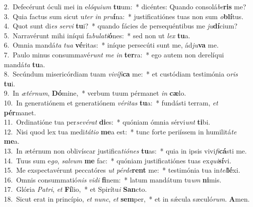 {2.~}Defecérunt óculi mei in e\textit{ló}\textit{qui}\textit{um} \textbf{tu}um:~* dicéntes: Quando consolá\textit{be}\textbf{ris} me?\\
{3.~}Quia factus sum sicut u\textit{ter} \textit{in} \textit{pru}\textbf{í}na:~* justificatiónes tuas non sum \textit{o}\textbf{blí}tus.\\
{4.~}Quot sunt di\textit{es} \textit{ser}\textit{vi} \textbf{tu}i?~* quando fácies de persequéntibus me \textit{ju}\textbf{dí}cium?\\
{5.~}Narravérunt mihi iníqui fa\textit{bu}\textit{la}\textit{ti}\textbf{ó}nes:~* sed non ut \textit{lex} \textbf{tu}a.\\
{6.~}Omnia mandá\textit{ta} \textit{tu}\textit{a} \textbf{vé}ritas:~* iníque persecúti sunt me, ád\textit{ju}\textbf{va} me.\\
{7.~}Paulo minus consummavé\textit{runt} \textit{me} \textit{in} \textbf{ter}ra:~* ego autem non derelíqui mandá\textit{ta} \textbf{tu}a.\\
{8.~}Secúndum misericórdiam tuam \textit{vi}\textit{ví}\textit{fi}\textbf{ca} me:~* et custódiam testimónia o\textit{ris} \textbf{tu}i.\\
{9.~}In \textit{æ}\textit{tér}\textit{num}, \textbf{Dó}mine,~* verbum tuum pérmanet \textit{in} \textbf{cæ}lo.\\
{10.~}In generatiónem et generatiónem \textit{vé}\textit{ri}\textit{tas} \textbf{tu}a:~* fundásti terram, \textit{et} \textbf{pér}manet.\\
{11.~}Ordinatióne tua per\textit{se}\textit{vé}\textit{rat} \textbf{di}es:~* quóniam ómnia sérvi\textit{unt} \textbf{ti}bi.\\
{12.~}Nisi quod lex tua medi\textit{tá}\textit{ti}\textit{o} \textbf{me}a est:~* tunc forte periíssem in humilitá\textit{te} \textbf{me}a.\\
{13.~}In ætérnum non oblivíscar justifica\textit{ti}\textit{ó}\textit{nes} \textbf{tu}as:~* quia in ipsis vivi\textit{fi}\textbf{cá}sti me.\\
{14.~}Tuus sum e\textit{go}, \textit{sal}\textit{vum} \textbf{me} fac:~* quóniam justificatiónes tuas ex\textit{qui}\textbf{sí}vi.\\
{15.~}Me exspectavérunt peccatóres \textit{ut} \textit{pér}\textit{de}\textbf{rent} me:~* testimónia tua in\textit{tel}\textbf{lé}xi.\\
{16.~}Omnis consummatió\textit{nis} \textit{vi}\textit{di} \textbf{fi}nem:~* latum mandátum tu\textit{um} \textbf{ni}mis.\\
{17.~}Glória \textit{Pa}\textit{tri}, \textit{et} \textbf{Fí}lio,~* et Spirítu\textit{i} \textbf{San}cto.\\
{18.~}Sicut erat in princípio, \textit{et} \textit{nunc}, \textit{et} \textbf{sem}per,~* et in sǽcula sæculó\textit{rum}. \textbf{A}men.\\
